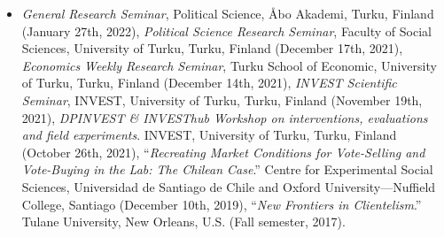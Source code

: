 \begin{itemize}
	\item[\textcolor{gray}{\textbullet}] \emph{General Research Seminar}, Political Science, \AA bo Akademi, Turku, Finland (January 27th, 2022), \emph{Political Science Research Seminar}, Faculty of Social Sciences, University of Turku, Turku, Finland (December 17th, 2021), \emph{Economics Weekly Research Seminar}, Turku School of Economic, University of Turku, Turku, Finland (December 14th, 2021), \emph{INVEST Scientific Seminar}, INVEST, University of Turku, Turku, Finland (November 19th, 2021), \emph{DPINVEST \& INVESThub Workshop on interventions, evaluations and field experiments}. INVEST, University of Turku, Turku, Finland (October 26th, 2021), ``\emph{Recreating Market Conditions for Vote-Selling and Vote-Buying in the Lab: The Chilean Case}.'' Centre for Experimental Social Sciences, Universidad de Santiago de Chile and Oxford University---Nuffield College, Santiago (December 10th, 2019), ``\emph{New Frontiers in Clientelism}.'' Tulane University, New Orleans, U.S. (Fall semester, 2017).
\end{itemize}

